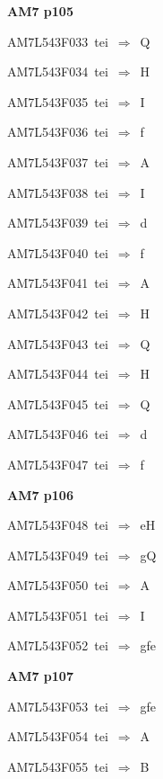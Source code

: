\par\vfill\eject
{\bf\hfill AM7 p105\hfill\hbox{}}\par\bigskip
{\sixrm AM7L543F033\ {\sixit tei}\ }$\Rightarrow$\ Q\par\smallskip
{\sixrm AM7L543F034\ {\sixit tei}\ }$\Rightarrow$\ H\par\smallskip
{\sixrm AM7L543F035\ {\sixit tei}\ }$\Rightarrow$\ I\par\smallskip
{\sixrm AM7L543F036\ {\sixit tei}\ }$\Rightarrow$\ {\tenit f}\par\smallskip
{\sixrm AM7L543F037\ {\sixit tei}\ }$\Rightarrow$\ A\par\smallskip
{\sixrm AM7L543F038\ {\sixit tei}\ }$\Rightarrow$\ I\par\smallskip
{\sixrm AM7L543F039\ {\sixit tei}\ }$\Rightarrow$\ {\tenit d}\par\smallskip
{\sixrm AM7L543F040\ {\sixit tei}\ }$\Rightarrow$\ {\tenit f}\par\smallskip
{\sixrm AM7L543F041\ {\sixit tei}\ }$\Rightarrow$\ A\par\smallskip
{\sixrm AM7L543F042\ {\sixit tei}\ }$\Rightarrow$\ H\par\smallskip
{\sixrm AM7L543F043\ {\sixit tei}\ }$\Rightarrow$\ Q\par\smallskip
{\sixrm AM7L543F044\ {\sixit tei}\ }$\Rightarrow$\ H\par\smallskip
{\sixrm AM7L543F045\ {\sixit tei}\ }$\Rightarrow$\ Q\par\smallskip
{\sixrm AM7L543F046\ {\sixit tei}\ }$\Rightarrow$\ {\tenit d}\par\smallskip
{\sixrm AM7L543F047\ {\sixit tei}\ }$\Rightarrow$\ {\tenit f}\par\smallskip

\par\vfill\eject
{\bf\hfill AM7 p106\hfill\hbox{}}\par\bigskip
{\sixrm AM7L543F048\ {\sixit tei}\ }$\Rightarrow$\ {\tenit e}H\par\smallskip
{\sixrm AM7L543F049\ {\sixit tei}\ }$\Rightarrow$\ {\tenit g}Q\par\smallskip
{\sixrm AM7L543F050\ {\sixit tei}\ }$\Rightarrow$\ A\par\smallskip
{\sixrm AM7L543F051\ {\sixit tei}\ }$\Rightarrow$\ I\par\smallskip
{\sixrm AM7L543F052\ {\sixit tei}\ }$\Rightarrow$\ {\tenit gfe}\par\smallskip

\par\vfill\eject
{\bf\hfill AM7 p107\hfill\hbox{}}\par\bigskip
{\sixrm AM7L543F053\ {\sixit tei}\ }$\Rightarrow$\ {\tenit gfe}\par\smallskip
{\sixrm AM7L543F054\ {\sixit tei}\ }$\Rightarrow$\ A\par\smallskip
{\sixrm AM7L543F055\ {\sixit tei}\ }$\Rightarrow$\ B\par\smallskip

